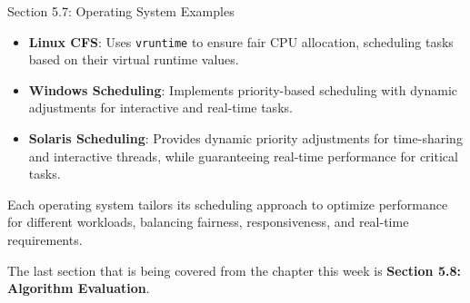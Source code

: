 \begin{notes}{Section 5.7: Operating System Examples}
\begin{highlight}
    \end{highlight}
    
    \begin{highlight}
    
        \begin{itemize}
            \item \textbf{Linux CFS}: Uses \texttt{vruntime} to ensure fair CPU allocation, scheduling tasks based on their virtual runtime values.
            \item \textbf{Windows Scheduling}: Implements priority-based scheduling with dynamic adjustments for interactive and real-time tasks.
            \item \textbf{Solaris Scheduling}: Provides dynamic priority adjustments for time-sharing and interactive threads, while guaranteeing real-time performance for critical tasks.
        \end{itemize}
    
    Each operating system tailors its scheduling approach to optimize performance for different workloads, balancing fairness, responsiveness, and real-time requirements.
    
    \end{highlight}
\end{notes}

The last section that is being covered from the chapter this week is \textbf{Section 5.8: Algorithm Evaluation}.

